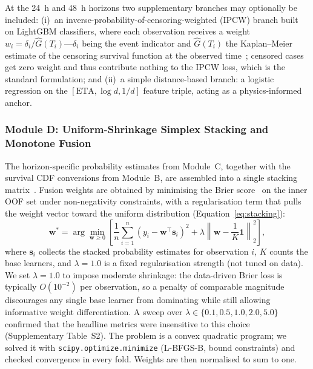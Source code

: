 \documentclass[fire,article,submit,pdftex]{../Definitions/mdpi}
\begin{document}
At the 24~h and 48~h horizons two supplementary branches may optionally be included:
(i)~an inverse-probability-of-censoring-weighted (IPCW) branch built on LightGBM classifiers, where each observation receives a weight $w_i = \delta_i / \hat{G}(T_i)$---$\delta_i$ being the event indicator and $\hat{G}(T_i)$ the Kaplan--Meier estimate of the censoring survival function at the observed time~\cite{Uno2011,Graf1999}; censored cases get zero weight and thus contribute nothing to the IPCW loss, which is the standard formulation; and
(ii)~a simple distance-based branch: a logistic regression on the $[\text{ETA}, \log d, 1/d]$ feature triple, acting as a physics-informed anchor.

\subsubsection{Module D: Uniform-Shrinkage Simplex Stacking and Monotone Fusion}

The horizon-specific probability estimates from Module~C, together with the survival CDF conversions from Module~B, are assembled into a single stacking matrix~\cite{Wolpert1992,VanderLaan2007}.
Fusion weights are obtained by minimising the Brier score~\cite{Brier1950} on the inner OOF set under non-negativity constraints, with a regularisation term that pulls the weight vector toward the uniform distribution (Equation~\eqref{eq:stacking}):
\begin{equation}
    \mathbf{w}^* = \arg\min_{\mathbf{w} \geq 0} \left[ \frac{1}{n} \sum_{i=1}^{n} \left( y_i - \mathbf{w}^\top \mathbf{s}_i \right)^2 + \lambda \left\| \mathbf{w} - \frac{1}{K}\mathbf{1} \right\|_2^2 \right],
    \label{eq:stacking}
\end{equation}
where $\mathbf{s}_i$ collects the stacked probability estimates for observation $i$, $K$ counts the base learners, and $\lambda = 1.0$ is a fixed regularisation strength (not tuned on data).
We set $\lambda = 1.0$ to impose moderate shrinkage: the data-driven Brier loss is typically $O(10^{-2})$ per observation, so a penalty of comparable magnitude discourages any single base learner from dominating while still allowing informative weight differentiation.
A sweep over $\lambda \in \{0.1, 0.5, 1.0, 2.0, 5.0\}$ confirmed that the headline metrics were insensitive to this choice (Supplementary Table~S2).
The problem is a convex quadratic program; we solved it with \texttt{scipy.optimize.minimize} (L-BFGS-B, bound constraints) and checked convergence in every fold.
Weights are then normalised to sum to one.
\end{document}
